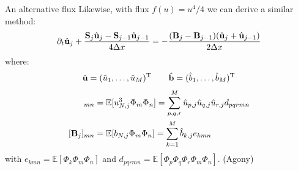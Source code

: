 \documentclass[
    pdf,
    11pt,
    xcolor={svgnames},
  ]{beamer}
\begin{document}
\begin{frame}{An alternative flux}
    Likewise, with flux $f(u) = u^4 / 4$ we can derive a similar method:
   \begin{equation}
       \partial_t \hat{\vb{u}}_j + \frac{\vb{S}_j \hat{\vb{u}}_j - \vb{S}_{j-1} \hat{\vb{u}}_{j-1}}{4\Delta x} = -\frac{(\vb{B}_j - \vb{B}_{j-1})(\hat{\vb{u}}_j + \hat{\vb{u}}_{j-1})}{2\Delta x}
   \end{equation} 
   where:
   \begin{equation*}
       \hat{\vb{u}} = (\hat{u}_1, \dots, \hat{u}_M)^\mathrm{T}
       \qquad
       \hat{\vb{b}} = (\hat{b}_1, \dots, \hat{b}_M)^\mathrm{T}
   \end{equation*}
   \begin{align*}
       [\vb{S}_j]_{mn} &= \mathbb{E}[u_{N,j}^3 \Phi_m \Phi_n]  = \sum_{p,q,r}^M \hat{u}_{p,j} \hat{u}_{q,j} \hat{u}_{r,j} d_{pqrmn}\\
       [\vb{B}_j]_{mn} &= \mathbb{E}[b_{N,j} \Phi_m \Phi_n] = \sum_{k=1}^M \hat{b}_{k,j} e_{kmn}
   \end{align*}
   with $e_{kmn} = \mathbb{E}[\Phi_k \Phi_m \Phi_n]$ and $d_{pqrmn} = \mathbb{E}[\Phi_p \Phi_q \Phi_r \Phi_m \Phi_n]$. (Agony)
\end{frame}
\end{document}
